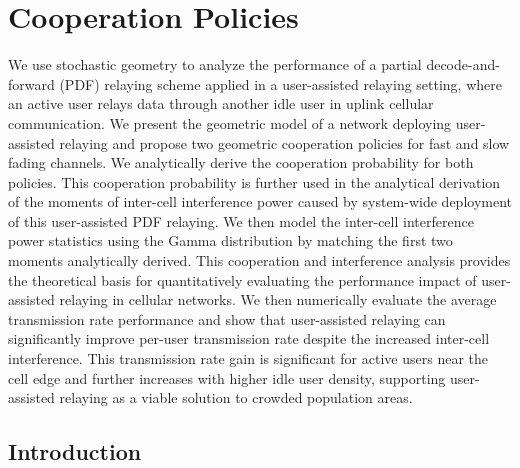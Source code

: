 \chapter{Cooperation Policies}
We use stochastic geometry to analyze the performance of a partial decode-and-forward (PDF) relaying scheme applied in a user-assisted relaying setting, where an active user relays data through another idle user in uplink cellular communication. We present the geometric model of a network deploying user-assisted relaying and propose two geometric cooperation policies for fast and slow fading channels. We analytically derive the cooperation probability for both policies. This cooperation
probability is further used in the analytical derivation of the
moments of inter-cell interference power caused by system-wide
deployment of this user-assisted PDF relaying. We then model the
inter-cell interference power statistics using the Gamma distribution by matching the first two moments analytically derived. This
cooperation and interference analysis provides the theoretical
basis for quantitatively evaluating the performance impact of
user-assisted relaying in cellular networks. We then numerically
evaluate the average transmission rate performance and show
that user-assisted relaying can significantly improve per-user
transmission rate despite the increased inter-cell interference. This
transmission rate gain is significant for active users near the
cell edge and further increases with higher idle user density,
supporting user-assisted relaying as a viable solution to crowded
population areas.

\section{Introduction}

